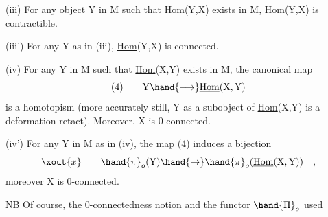 (iii) For any object Y in M such that \uline{Hom}(Y,X) exists in M, \uline{Hom}(Y,X)
is contractible.

(iii') For any Y as in (iii), \uline{Hom}(Y,X) is connected.

(iv) For any Y in M such that \uline{Hom}(X,Y) exists in M, the canonical
map
\[ (4) \qquad \mathrm{Y} \hand{\longrightarrow} \underline{\mathrm{Hom}}(\mathrm{X},\mathrm{Y}) \]
is a homotopism (more accurately still, Y as a subobject of
\uline{Hom}(X,Y) is a deformation retact). Moreover, X is 0-connected.

(iv') For any Y in M as in (iv), the map (4) induces a bijection 
\[ \xout{x} \qquad \hand{\pi}_o(\mathrm{Y}) \hand{\to} \hand{\pi}_o(\underline{\mathrm{Hom}}(\mathrm{X},\mathrm{Y})) \quad , \]
moreover X is 0-connected.

NB Of course, the 0-connectedness notion and the functor $\hand{\Pi}_o$ used 

